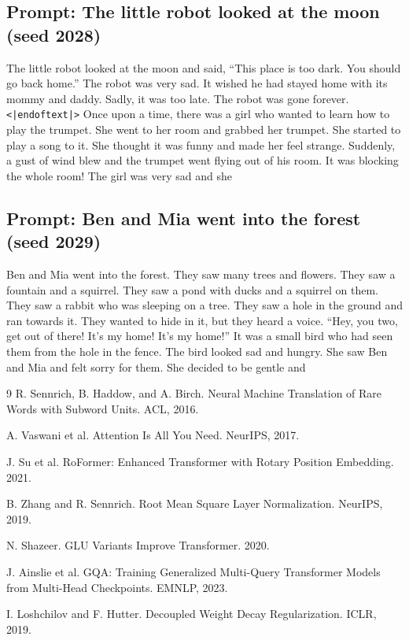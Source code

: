 \documentclass[10pt]{article}
\begin{document}
\subsection{Prompt: The little robot looked at the moon (seed 2028)}
The little robot looked at the moon and said, ``This place is too dark. You should go back home.''
The robot was very sad. It wished he had stayed home with its mommy and daddy. Sadly, it was too
late. The robot was gone forever. \texttt{\textless|endoftext|\textgreater} Once upon a time, there
was a girl who wanted to learn how to play the trumpet. She went to her room and grabbed her
trumpet. She started to play a song to it. She thought it was funny and made her feel strange.
Suddenly, a gust of wind blew and the trumpet went flying out of his room. It was blocking the whole
room! The girl was very sad and she

\subsection{Prompt: Ben and Mia went into the forest (seed 2029)}
Ben and Mia went into the forest. They saw many trees and flowers. They saw a fountain and a
squirrel. They saw a pond with ducks and a squirrel on them. They saw a rabbit who was sleeping on
a tree. They saw a hole in the ground and ran towards it. They wanted to hide in it, but they heard
a voice. ``Hey, you two, get out of there! It's my home! It's my home!'' It was a small bird who had
seen them from the hole in the fence. The bird looked sad and hungry. She saw Ben and Mia and felt
sorry for them. She decided to be gentle and

\clearpage
\begin{thebibliography}{9}
R. Sennrich, B. Haddow, and A. Birch. Neural Machine Translation of Rare Words with Subword Units.
ACL, 2016.

A. Vaswani et al. Attention Is All You Need. NeurIPS, 2017.

J. Su et al. RoFormer: Enhanced Transformer with Rotary Position Embedding. 2021.

B. Zhang and R. Sennrich. Root Mean Square Layer Normalization. NeurIPS, 2019.

N. Shazeer. GLU Variants Improve Transformer. 2020.

J. Ainslie et al. GQA: Training Generalized Multi-Query Transformer Models from Multi-Head
Checkpoints. EMNLP, 2023.

I. Loshchilov and F. Hutter. Decoupled Weight Decay Regularization. ICLR, 2019.
\end{thebibliography}
\end{document}

